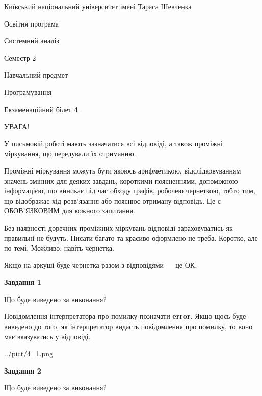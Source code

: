 \documentclass[12pt, ukrainian]{article}
\begin{document}
{{\begin {small}\par
{ \center  Київський національний університет імені Тараса Шевченка \par}
{\parbox {5 cm}{Освітня програма \hfill}{\parbox {7 cm}{Системний аналіз \hfill}}\parbox {6 cm}{\hfill Семестр 2}}\par
{\parbox {5 cm} {Навчальний предмет \hfill}\parbox {7 cm}{Програмування \hfill}\parbox {6cm}{\hfill}\par}\vspace{-7pt} \end{small}}{\center Екзаменаційний білет \No \textbf
{ 4 }\par}}
{
\begin {large}
УВАГА!

У письмовій роботі мають зазначатися всі відповіді, а також проміжні міркування, що передували їх отриманню.

Проміжні міркування можуть бути якоюсь арифметикою, відслідковуванням зна\-чень змінних для деяких завдань,
короткими поясненнями, допоміжною інформацією, що виникає під час обходу графів, робочею чернеткою,
тобто тим, що відображає хід розв’язання або пояснює отриману відповідь.
Це є ОБОВ’ЯЗКОВИМ для кожного запитання.

Без наявності доречних проміжних міркувань відповіді зараховуватись як правиль\-ні не будуть.
Писати багато та красиво оформлено не треба. Коротко, але по темі. Можли\-во, навіть чернетка.

Якщо на аркуші буде чернетка разом з відповідями --- це ОК.

\newpage

{\begin {center}\textbf{Завдання 1}\end {center}}\par
Що буде виведено за виконання?

Повідомлення інтерпретатора про помилку позначати \textbf{error}.
Якщо щось буде виведено до того, як інтерпретатор видасть повідомлення про помилку, 
то воно має вказуватись у відповіді. \par


\begin{center}
	{../pict/4_1.png}
\end{center}
\newpage

{\begin {center}\textbf{Завдання 2}\end {center}}\par
Що буде виведено за виконання?


\end{large}}
\end{document}
